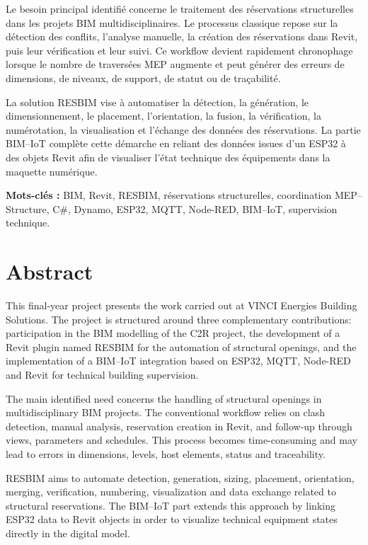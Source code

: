 \documentclass[12pt,a4paper]{report}
\begin{document}
Le besoin principal identifié concerne le traitement des réservations structurelles dans les projets BIM multidisciplinaires. Le processus classique repose sur la détection des conflits, l'analyse manuelle, la création des réservations dans Revit, puis leur vérification et leur suivi. Ce workflow devient rapidement chronophage lorsque le nombre de traversées MEP augmente et peut générer des erreurs de dimensions, de niveaux, de support, de statut ou de traçabilité.

La solution RESBIM vise à automatiser la détection, la génération, le dimensionnement, le placement, l'orientation, la fusion, la vérification, la numérotation, la visualisation et l'échange des données des réservations. La partie BIM--IoT complète cette démarche en reliant des données issues d'un ESP32 à des objets Revit afin de visualiser l'état technique des équipements dans la maquette numérique.

\textbf{Mots-clés :} BIM, Revit, RESBIM, réservations structurelles, coordination MEP--Structure, C\#, Dynamo, ESP32, MQTT, Node-RED, BIM--IoT, supervision technique.

\chapter*{Abstract}
This final-year project presents the work carried out at VINCI Energies Building Solutions. The project is structured around three complementary contributions: participation in the BIM modelling of the C2R project, the development of a Revit plugin named RESBIM for the automation of structural openings, and the implementation of a BIM--IoT integration based on ESP32, MQTT, Node-RED and Revit for technical building supervision.

The main identified need concerns the handling of structural openings in multidisciplinary BIM projects. The conventional workflow relies on clash detection, manual analysis, reservation creation in Revit, and follow-up through views, parameters and schedules. This process becomes time-consuming and may lead to errors in dimensions, levels, host elements, status and traceability.

RESBIM aims to automate detection, generation, sizing, placement, orientation, merging, verification, numbering, visualization and data exchange related to structural reservations. The BIM--IoT part extends this approach by linking ESP32 data to Revit objects in order to visualize technical equipment states directly in the digital model.
\end{document}
